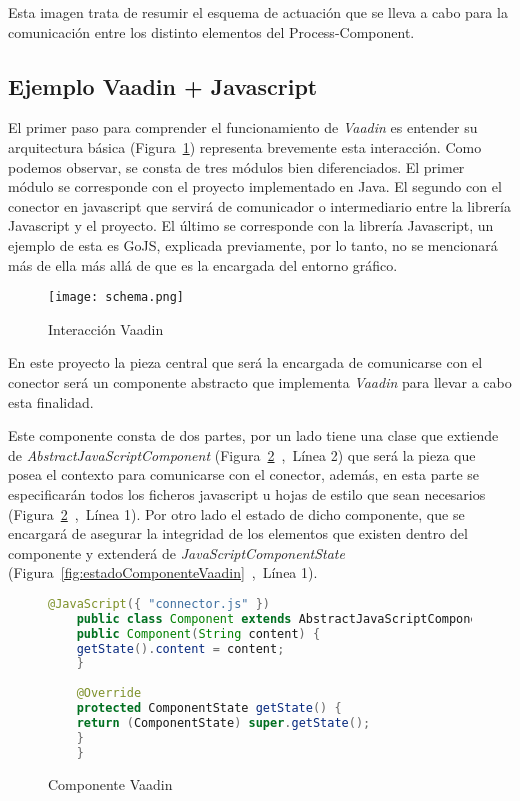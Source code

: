 Esta imagen trata de  resumir el esquema de actuación que se lleva a cabo para la comunicación entre los distinto elementos del Process-Component.

\subsection{Ejemplo Vaadin + Javascript}

El primer paso para comprender el funcionamiento de \emph{Vaadin} es entender su arquitectura básica (Figura~\ref{fig:schema}) representa brevemente esta interacción. Como podemos observar, se consta de tres módulos bien diferenciados. El primer módulo se corresponde con el proyecto implementado en Java. El segundo con el conector en javascript que servirá de comunicador o intermediario entre la librería Javascript y el proyecto. El último se corresponde con la librería Javascript, un ejemplo de esta es GoJS, explicada previamente, por lo tanto, no se mencionará más de ella más allá de que es la encargada del entorno gráfico.



\begin{figure}[!tb]
	\centering
	\texttt{[image: schema.png]}
	\caption{Interacción Vaadin}\label{fig:schema}
\end{figure}




En este proyecto la pieza central que será la encargada de comunicarse con el conector será un componente abstracto que implementa \emph{Vaadin} para llevar a cabo esta finalidad.

Este componente consta de dos partes, por un lado tiene una clase que extiende de \emph{AbstractJavaScriptComponent} (Figura~\ref{fig:componenteVaadin}~,~Línea 2) que será la pieza que posea el contexto para comunicarse con el conector, además, en esta parte se especificarán todos los ficheros javascript u hojas de estilo que sean necesarios (Figura~\ref{fig:componenteVaadin}~,~Línea 1). Por otro lado el estado de dicho componente, que se encargará de asegurar la integridad de los elementos que existen dentro del componente y extenderá de \emph{JavaScriptComponentState} (Figura~\ref{fig:estadoComponenteVaadin}~,~Línea 1).

\begin{figure}[!tb]
	\centering
	\begin{lstlisting}[language=Java]
	@JavaScript({ "connector.js" })
	public class Component extends AbstractJavaScriptComponent {
	public Component(String content) {
	getState().content = content;
	}
	
	@Override
	protected ComponentState getState() {
	return (ComponentState) super.getState();
	}
	}
	\end{lstlisting}
	\caption{Componente Vaadin}
	\label{fig:componenteVaadin}
\end{figure}


